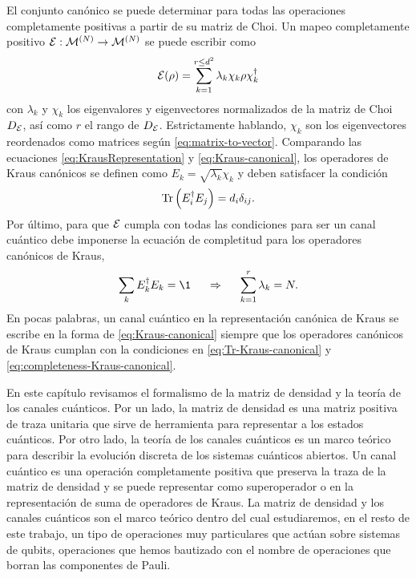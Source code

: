 El conjunto canónico se puede determinar para todas las operaciones 
completamente positivas a partir de su matriz de Choi. Un mapeo 
completamente positivo $\mathcal{E}:\mathcal{M}^{(N)}\to\mathcal{M}^{(N)}$ 
se puede escribir como~\citep{bengtsson_zyczkowski_2017}
\begin{align}
\mathcal{E}(\rho) = 
\sum_{k=1}^{r\leq d^2}\lambda_k\chi_k\rho\chi_k^{\dagger}
\label{eq:Kraus-canonical}
\end{align}
con $\lambda_k$ y $\chi_k$ los eigenvalores y eigenvectores 
normalizados de la matriz de Choi $D_{\mathcal{E}}$, así como $r$ el rango 
de $D_{\mathcal{E}}$. 
Estrictamente hablando, $\chi_k$ son los eigenvectores reordenados 
como matrices según \eqref{eq:matrix-to-vector}.
Comparando las ecuaciones \eqref{eq:KrausRepresentation} y
\eqref{eq:Kraus-canonical}, los operadores de Kraus canónicos 
se definen como $E_k=\sqrt{\lambda_k}\chi_k$ y deben satisfacer
la condición
\begin{align}
  \Tr\qty(E_i^{\dagger}E_j)=d_i\delta_{ij}.
  \label{eq:Tr-Kraus-canonical}
\end{align}
Por último, para que $\mathcal{E}$ cumpla con todas las condiciones para 
ser un canal cuántico debe imponerse la ecuación de completitud 
para los operadores canónicos de Kraus,
\begin{align}
  \sum_kE_k^{\dagger}E_k=\1
  \hspace{0.5cm}\Rightarrow\hspace{0.5cm}
  \sum_{k=1}^r\lambda_k=N .
  \label{eq:completeness-Kraus-canonical}
\end{align}
En pocas palabras, un canal cuántico en la representación canónica de 
Kraus se escribe en la forma de \eqref{eq:Kraus-canonical}
siempre que los operadores canónicos de Kraus cumplan con 
la condiciones en \eqref{eq:Tr-Kraus-canonical} y 
\eqref{eq:completeness-Kraus-canonical}. 

En este capítulo revisamos el formalismo de la matriz de densidad
y la teoría de los canales cuánticos. Por un lado, la matriz de densidad es una 
matriz positiva de traza unitaria que sirve de herramienta para 
representar a los estados cuánticos. 
Por otro lado, la teoría de los canales cuánticos es un marco teórico 
para describir la evolución discreta de los sistemas cuánticos abiertos. 
Un canal cuántico es una operación completamente positiva que 
preserva la traza de la matriz de densidad y se puede representar 
como superoperador o en la representación de 
suma de operadores de Kraus. La matriz de densidad y los canales 
cuánticos son el marco teórico dentro del cual estudiaremos, en 
el resto de este trabajo, un tipo de operaciones muy particulares 
que actúan sobre sistemas de qubits, operaciones que hemos bautizado 
con el nombre de operaciones que borran las componentes de Pauli.


